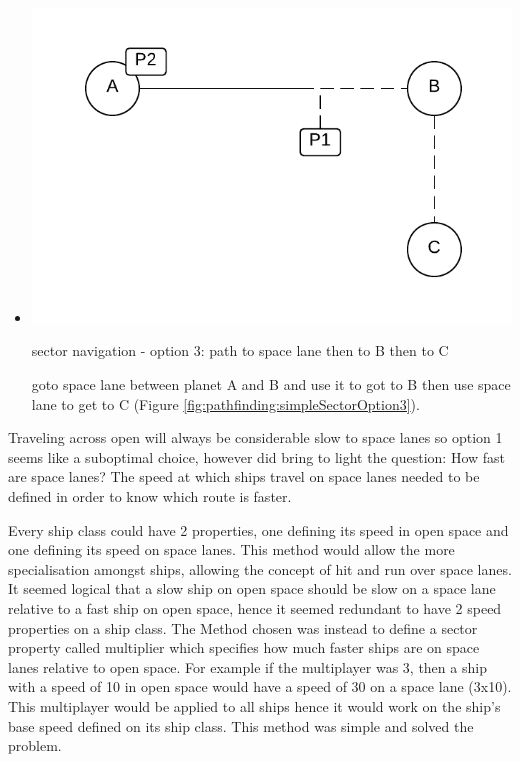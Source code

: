 \begin{itemize}
\item 
\begin{marginfigure}
	\includegraphics{res/pathfinding/PathFindingSectorOption3.pdf}
    \caption{sector navigation - option 3: path to space lane then to B then to C}
	\label{fig:pathfinding:simpleSectorOption3}
\end{marginfigure}
goto space lane between planet A and B and use it to got to B then use space lane to get to C (Figure \ref{fig:pathfinding:simpleSectorOption3}).

\end{itemize}

Traveling across open will always be considerable slow to space lanes so option 1 seems like a suboptimal choice, however did bring to light the question: How fast are space lanes?
The speed at which ships travel on space lanes needed to be defined in order to know which route is faster.

Every ship class could have 2 properties, one defining its speed in open space and one defining its speed on space lanes.
This method would allow the more specialisation amongst ships, allowing the concept of hit and run over space lanes. 
It seemed logical that a slow ship on open space should be slow on a space lane relative to a fast ship on open space, hence it seemed redundant to have 2 speed properties on a ship class.
The Method chosen was instead to define a sector property called multiplier which specifies how much faster ships are on space lanes relative to open space.
For example if the multiplayer was 3, then a ship with a speed of 10 in open space would have a speed of 30 on a space lane (3x10).
This multiplayer would be applied to all ships hence it would work on the ship's base speed defined on its ship class.
This method was simple and solved the problem.

